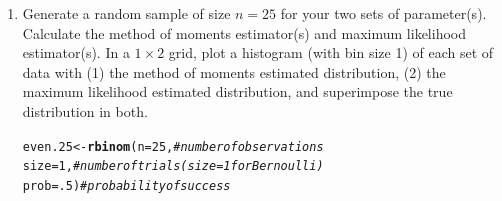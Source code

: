 \documentclass{article}\usepackage[]{graphicx}\usepackage[]{color}
\makeatletter
\newcommand{\hlnum}[1]{\textcolor[rgb]{0.686,0.059,0.569}{#1}}%
\newcommand{\hlcom}[1]{\textcolor[rgb]{0.678,0.584,0.686}{\textit{#1}}}%
\newcommand{\hlstd}[1]{\textcolor[rgb]{0.345,0.345,0.345}{#1}}%
\newcommand{\hlkwb}[1]{\textcolor[rgb]{0.69,0.353,0.396}{#1}}%
\newcommand{\hlkwc}[1]{\textcolor[rgb]{0.333,0.667,0.333}{#1}}%
\newcommand{\hlkwd}[1]{\textcolor[rgb]{0.737,0.353,0.396}{\textbf{#1}}}%
\newenvironment{kframe}{%
 \def\at@end@of@kframe{}%
 \ifinner\ifhmode%
  \def\at@end@of@kframe{\end{minipage}}%
  \begin{minipage}{\columnwidth}%
 \fi\fi%
 \def\FrameCommand##1{\hskip\@totalleftmargin \hskip-\fboxsep
 \colorbox{shadecolor}{##1}\hskip-\fboxsep
     \hskip-\linewidth \hskip-\@totalleftmargin \hskip\columnwidth}%
 \MakeFramed {\advance\hsize-\width
   \@totalleftmargin\z@ \linewidth\hsize
   \@setminipage}}%
 {\par\unskip\endMakeFramed%
 \at@end@of@kframe}
\newenvironment{knitrout}{}{} %
\makeatother
\begin{document}
\begin{enumerate}
\begin{enumerate}
  \item Generate a random sample of size $n=25$ for your two sets of parameter(s). 
  Calculate the method of moments estimator(s) and maximum likelihood estimator(s).
  In a $1 \times 2$ grid, plot a histogram (with bin size 1) of each set of data 
  with (1) the method of moments estimated distribution, (2) the maximum likelihood 
  estimated distribution, and superimpose the true distribution in both.
\begin{knitrout}
\color{fgcolor}\begin{kframe}
\begin{alltt}
\hlstd{even.25} \hlkwb{<-} \hlkwd{rbinom}\hlstd{(}\hlkwc{n}\hlstd{=}\hlnum{25}\hlstd{,}        \hlcom{#number of observations}
                  \hlkwc{size}\hlstd{=}\hlnum{1}\hlstd{,}        \hlcom{#number of trials (size=1 for Bernoulli)}
                  \hlkwc{prob}\hlstd{=}\hlnum{.5}\hlstd{)}       \hlcom{#probability of success}


\end{alltt}
\end{kframe}
\end{knitrout}
\end{enumerate}
\end{enumerate}
\end{document}
